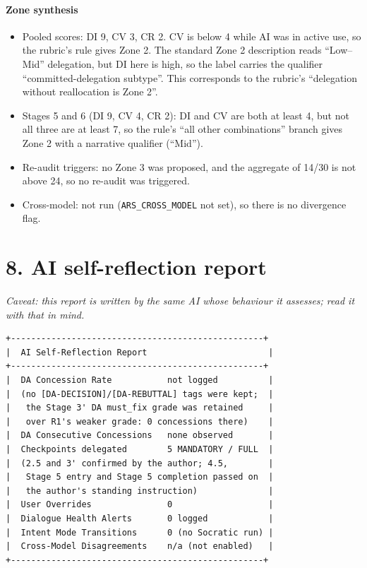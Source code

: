 \documentclass[12pt,a4paper]{article}
\providecommand{\tightlist}{\setlength{\itemsep}{0pt}\setlength{\parskip}{0pt}}
\begin{document}
\hypertarget{zone-synthesis}{%
\paragraph{Zone synthesis}\label{zone-synthesis}}

\begin{itemize}
\tightlist
\item
  Pooled scores: DI 9, CV 3, CR 2. CV is below 4 while AI was in active
  use, so the rubric's rule gives Zone 2. The standard Zone 2
  description reads ``Low--Mid'' delegation, but DI here is high, so the
  label carries the qualifier ``committed-delegation subtype''. This
  corresponds to the rubric's ``delegation without reallocation is Zone
  2''.
\item
  Stages 5 and 6 (DI 9, CV 4, CR 2): DI and CV are both at least 4, but
  not all three are at least 7, so the rule's ``all other combinations''
  branch gives Zone 2 with a narrative qualifier (``Mid'').
\item
  Re-audit triggers: no Zone 3 was proposed, and the aggregate of 14/30
  is not above 24, so no re-audit was triggered.
\item
  Cross-model: not run (\texttt{ARS\_CROSS\_MODEL} not set), so there is
  no divergence flag.
\end{itemize}

\hypertarget{ai-self-reflection-report}{%
\section{8. AI self-reflection report}\label{ai-self-reflection-report}}

\emph{Caveat: this report is written by the same AI whose behaviour it
assesses; read it with that in mind.}

\begin{verbatim}
+--------------------------------------------------+
|  AI Self-Reflection Report                        |
+--------------------------------------------------+
|  DA Concession Rate           not logged          |
|  (no [DA-DECISION]/[DA-REBUTTAL] tags were kept;  |
|   the Stage 3' DA must_fix grade was retained     |
|   over R1's weaker grade: 0 concessions there)    |
|  DA Consecutive Concessions   none observed       |
|  Checkpoints delegated        5 MANDATORY / FULL  |
|  (2.5 and 3' confirmed by the author; 4.5,        |
|   Stage 5 entry and Stage 5 completion passed on  |
|   the author's standing instruction)              |
|  User Overrides               0                   |
|  Dialogue Health Alerts       0 logged            |
|  Intent Mode Transitions      0 (no Socratic run) |
|  Cross-Model Disagreements    n/a (not enabled)   |
+--------------------------------------------------+
\end{verbatim}
\end{document}
